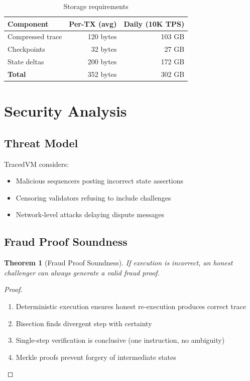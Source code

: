\documentclass[11pt,a4paper]{article}
\newtheorem{theorem}{Theorem}
\begin{document}
\begin{table}[h]
\centering
\begin{tabular}{lrr}
\toprule
\textbf{Component} & \textbf{Per-TX (avg)} & \textbf{Daily (10K TPS)} \\
\midrule
Compressed trace & 120 bytes & 103 GB \\
Checkpoints & 32 bytes & 27 GB \\
State deltas & 200 bytes & 172 GB \\
\textbf{Total} & 352 bytes & 302 GB \\
\bottomrule
\end{tabular}
\caption{Storage requirements}
\end{table}

\section{Security Analysis}

\subsection{Threat Model}

TracedVM considers:
\begin{itemize}
    \item Malicious sequencers posting incorrect state assertions
    \item Censoring validators refusing to include challenges
    \item Network-level attacks delaying dispute messages
\end{itemize}

\subsection{Fraud Proof Soundness}

\begin{theorem}[Fraud Proof Soundness]
If execution is incorrect, an honest challenger can always generate a valid fraud proof.
\end{theorem}

\begin{proof}
\begin{enumerate}
    \item Deterministic execution ensures honest re-execution produces correct trace
    \item Bisection finds divergent step with certainty
    \item Single-step verification is conclusive (one instruction, no ambiguity)
    \item Merkle proofs prevent forgery of intermediate states
\end{enumerate}
\end{proof}
\end{document}
